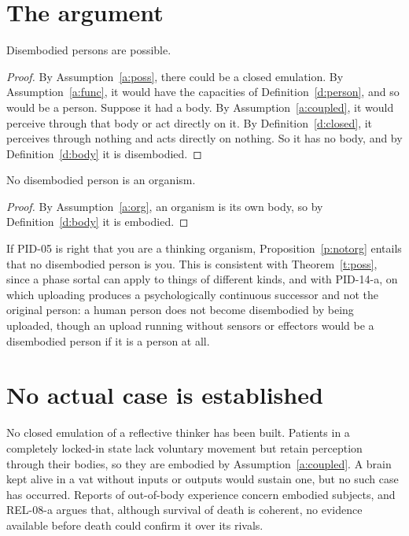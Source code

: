 \documentclass{situationist-preprint}
\begin{document}
\section{The argument}\label{s:arg}

\begin{theorem}\label{t:poss}
Disembodied persons are possible.
\end{theorem}

\begin{proof}
By Assumption~\ref{a:poss}, there could be a closed emulation. By Assumption~\ref{a:func}, it would have the capacities of Definition~\ref{d:person}, and so would be a person. Suppose it had a body. By Assumption~\ref{a:coupled}, it would perceive through that body or act directly on it. By Definition~\ref{d:closed}, it perceives through nothing and acts directly on nothing. So it has no body, and by Definition~\ref{d:body} it is disembodied.
\end{proof}

\begin{proposition}\label{p:notorg}
No disembodied person is an organism.
\end{proposition}

\begin{proof}
By Assumption~\ref{a:org}, an organism is its own body, so by Definition~\ref{d:body} it is embodied.
\end{proof}

\begin{remark}\label{r:you}
If PID-05 is right that you are a thinking organism, Proposition~\ref{p:notorg} entails that no disembodied person is you. This is consistent with Theorem~\ref{t:poss}, since a phase sortal can apply to things of different kinds, and with PID-14-a, on which uploading produces a psychologically continuous successor and not the original person: a human person does not become disembodied by being uploaded, though an upload running without sensors or effectors would be a disembodied person if it is a person at all.
\end{remark}

\section{No actual case is established}\label{s:actual}

No closed emulation of a reflective thinker has been built. Patients in a completely locked-in state lack voluntary movement but retain perception through their bodies, so they are embodied by Assumption~\ref{a:coupled}. A brain kept alive in a vat without inputs or outputs would sustain one, but no such case has occurred. Reports of out-of-body experience concern embodied subjects, and REL-08-a argues that, although survival of death is coherent, no evidence available before death could confirm it over its rivals.
\end{document}
